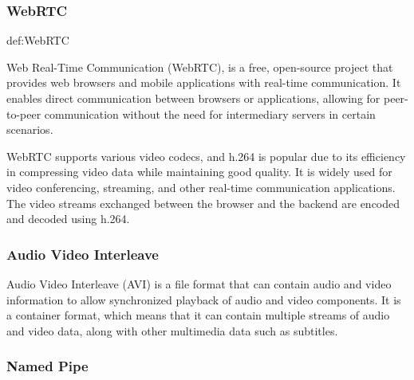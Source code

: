 \documentclass[../MasterThesis.tex]{subfiles}
\begin{document}
\subsubsection*{WebRTC} 

\begin{CountingDefinition}[WebRTC]{def:WebRTC}
	
	Web Real-Time Communication (WebRTC), is a free, open-source project that provides web browsers and mobile applications with real-time communication. It enables direct communication between browsers or applications, allowing for peer-to-peer communication without the need for intermediary servers in certain scenarios.
	
\end{CountingDefinition}

WebRTC supports various video codecs, and h.264 is popular due to its efficiency in compressing video data while maintaining good quality. It is widely used for video conferencing, streaming, and other real-time communication applications. The video streams exchanged between the browser and the backend are encoded and decoded using h.264.






\subsubsection*{Audio Video Interleave} 

Audio Video Interleave (AVI) is a file format that can contain audio and video information to allow synchronized playback of audio and video components. 
It is a container format, which means that it can contain multiple streams of audio and video data, along with other multimedia data such as subtitles.~\cite{avi}












\subsubsection*{Named Pipe} 
\end{document}
